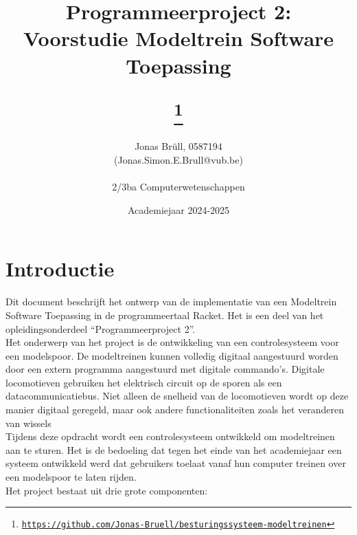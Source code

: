 \documentclass[a4paper, 11pt]{article}
\title{Programmeerproject 2:\\ Voorstudie Modeltrein Software Toepassing
	\author{Jonas Br\"ull, 0587194\\ (Jonas.Simon.E.Brull@vub.be)\\\\ 2/3ba Computerwetenschappen}
	\date{Academiejaar 2024-2025}
	\thanks{\texttt{\url{https://github.com/Jonas-Bruell/besturingssysteem-modeltreinen}}}
}
\newcommand{\<}{\scriptsize\textless\normalsize}
\renewcommand{\>}{\scriptsize\textgreater\normalsize}
\begin{document}
\maketitle
\newpage

\tableofcontents
\newpage

\pagestyle{fancy}
\setcounter{page}{1}

\section{Introductie} %
Dit document beschrijft het ontwerp van de implementatie van een Modeltrein Software Toepassing in de programmeertaal Racket. Het is een deel van het opleidingsonderdeel ``Programmeerproject 2''.\\
\newline
Het onderwerp van het project is de ontwikkeling van een controlesysteem voor een modelspoor. De modeltreinen kunnen volledig digitaal aangestuurd worden door een extern programma aangestuurd met digitale commando’s. Digitale locomotieven gebruiken het elektrisch circuit op de sporen als een datacommunicatiebus. Niet alleen de snelheid van de locomotieven wordt op deze manier digitaal
geregeld, maar ook andere functionaliteiten zoals het veranderen van wissels\\
\newline
Tijdens deze opdracht wordt een controlesysteem ontwikkeld om modeltreinen aan te sturen. Het is de
bedoeling dat tegen het einde van het academiejaar een systeem ontwikkeld werd dat gebruikers
toelaat vanaf hun computer treinen over een modelspoor te laten rijden.\\
\newline
Het project bestaat uit drie grote componenten:
\end{document}
